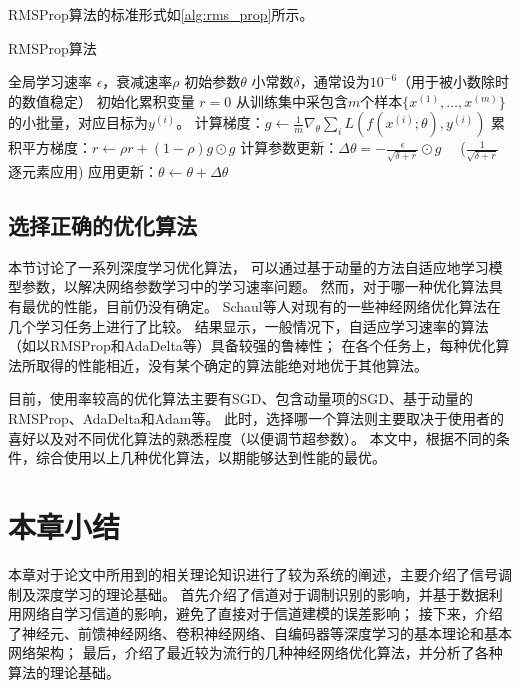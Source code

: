 RMSProp算法的标准形式如\ref{alg:rms_prop}所示。
\begin{algorithm}[ht]
	\caption{RMSProp算法}
	\label{alg:rms_prop}
	\begin{algorithmic}
		\REQUIRE 全局学习速率 $\epsilon$，衰减速率$\rho$
		\REQUIRE  初始参数$\theta$
		\REQUIRE 小常数$\delta$，通常设为$10^{-6}$（用于被小数除时的数值稳定）
		\STATE 初始化累积变量 $r = 0$
		\STATE 从训练集中采包含$m$个样本$\{ x^{(1)},\dots, x^{(m)}\}$ 的小批量，对应目标为$y^{(i)}$。
		\STATE 计算梯度：$g \leftarrow  
		\frac{1}{m} \nabla_{\theta} \sum_i L(f(x^{(i)};\theta),y^{(i)})$ 
		\STATE 累积平方梯度：$r \leftarrow \rho
		r + (1-\rho) g \odot g$
		\STATE 计算参数更新：$\Delta \theta =
		-\frac{\epsilon}{\sqrt{\delta + r}} \odot g$  \ \  ($\frac{1}{\sqrt{\delta + r}}$ 逐元素应用)
		\STATE 应用更新：$\theta \leftarrow \theta + \Delta \theta$
		\ENDWHILE
	\end{algorithmic}
\end{algorithm}

\subsection{选择正确的优化算法}
\label{sec:choosing_the_right_optimization_algorithms}
本节讨论了一系列深度学习优化算法，
可以通过基于动量的方法自适应地学习模型参数，以解决网络参数学习中的学习速率问题。
然而，对于哪一种优化算法具有最优的性能，目前仍没有确定。
Schaul等人对现有的一些神经网络优化算法在几个学习任务上进行了比较\cite{schaul2013unit}。
结果显示，一般情况下，自适应学习速率的算法（如以RMSProp和AdaDelta等）具备较强的鲁棒性；
在各个任务上，每种优化算法所取得的性能相近，没有某个确定的算法能绝对地优于其他算法。\par

目前，使用率较高的优化算法主要有SGD、包含动量项的SGD、基于动量的RMSProp、AdaDelta和Adam等。
此时，选择哪一个算法则主要取决于使用者的喜好以及对不同优化算法的熟悉程度（以便调节超参数）。
本文中，根据不同的条件，综合使用以上几种优化算法，以期能够达到性能的最优。

\section{本章小结}
本章对于论文中所用到的相关理论知识进行了较为系统的阐述，主要介绍了信号调制及深度学习的理论基础。
首先介绍了信道对于调制识别的影响，并基于数据利用网络自学习信道的影响，避免了直接对于信道建模的误差影响；
接下来，介绍了神经元、前馈神经网络、卷积神经网络、自编码器等深度学习的基本理论和基本网络架构；
最后，介绍了最近较为流行的几种神经网络优化算法，并分析了各种算法的理论基础。
